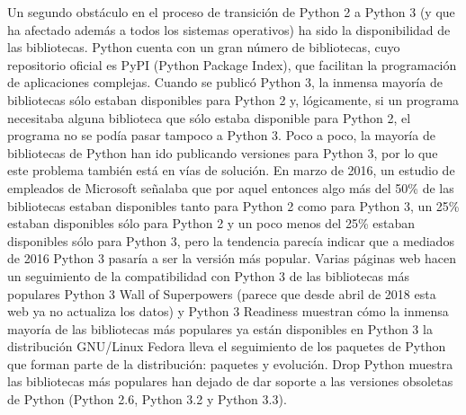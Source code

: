 Un segundo obstáculo en el proceso de transición de Python 2 a Python 3 (y que ha afectado además a todos los sistemas operativos) ha sido la disponibilidad de las bibliotecas.
Python cuenta con un gran número de bibliotecas, cuyo repositorio oficial es PyPI (Python Package Index), que facilitan la programación de aplicaciones complejas. Cuando se publicó Python 3, la inmensa mayoría de bibliotecas sólo estaban disponibles para Python 2 y, lógicamente, si un programa necesitaba alguna biblioteca que sólo estaba disponible para Python 2, el programa no se podía pasar tampoco a Python 3.
Poco a poco, la mayoría de bibliotecas de Python han ido publicando versiones para Python 3, por lo que este problema también está en vías de solución.
En marzo de 2016, un estudio de empleados de Microsoft señalaba que por aquel entonces algo más del 50\% de las bibliotecas estaban disponibles tanto para Python 2 como para Python 3, un 25\% estaban disponibles sólo para Python 2 y un poco menos del 25\% estaban disponibles sólo para Python 3, pero la tendencia parecía indicar que a mediados de 2016 Python 3 pasaría a ser la versión más popular.
Varias páginas web hacen un seguimiento de la compatibilidad con Python 3 de las bibliotecas más populares
Python 3 Wall of Superpowers (parece que desde abril de 2018 esta web ya no actualiza los datos) y Python 3 Readiness muestran cómo la inmensa mayoría de las bibliotecas más populares ya están disponibles en Python 3
la distribución GNU/Linux Fedora lleva el seguimiento de los paquetes de Python que forman parte de la distribución: paquetes y evolución.
Drop Python muestra las bibliotecas más populares han dejado de dar soporte a las versiones obsoletas de Python (Python 2.6, Python 3.2 y Python 3.3). \cite{BartolomeWebSite}